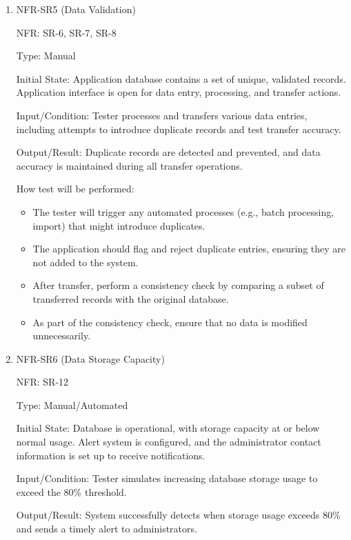 \documentclass[12pt, titlepage]{article}
\begin{document}
\begin{enumerate}
\item{NFR-SR5 (Data Validation)\\}
  
  NFR: SR-6, SR-7, SR-8
  
  Type: Manual
  
  Initial State: Application database contains a set of unique, validated records.
  Application interface is open for data entry, processing, and transfer actions.
  
  Input/Condition: Tester processes and transfers various data entries, including
  attempts to introduce duplicate records and test transfer accuracy.
  
  Output/Result: Duplicate records are detected and prevented, and data accuracy
  is maintained during all transfer operations.

  How test will be performed: 
  \begin{itemize}
    \item The tester will trigger any automated processes (e.g., batch processing,
    import) that might introduce duplicates.
    \item The application should flag and reject duplicate entries, ensuring
    they are not added to the system.
    \item After transfer, perform a consistency check by comparing a subset of
    transferred records with the original database.
    \item As part of the consistency check, ensure that no data is modified unnecessarily.
  \end{itemize}

\item{NFR-SR6 (Data Storage Capacity)\\}
  
  NFR: SR-12
  
  Type: Manual/Automated
  
  Initial State: Database is operational, with storage capacity at or below normal
  usage. Alert system is configured, and the administrator contact information is set
  up to receive notifications.

  Input/Condition: Tester simulates increasing database storage usage to exceed the
  80\% threshold.
  
  Output/Result: System successfully detects when storage usage exceeds 80\% and sends
  a timely alert to administrators.


\end{enumerate}
\end{document}
